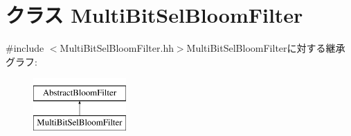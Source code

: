 \hypertarget{classMultiBitSelBloomFilter}{
\section{クラス MultiBitSelBloomFilter}
\label{classMultiBitSelBloomFilter}
}


{\ttfamily \#include $<$MultiBitSelBloomFilter.hh$>$}MultiBitSelBloomFilterに対する継承グラフ:\begin{figure}[H]
\begin{center}
\leavevmode
\includegraphics[height=2cm]{classMultiBitSelBloomFilter}
\end{center}
\end{figure}
